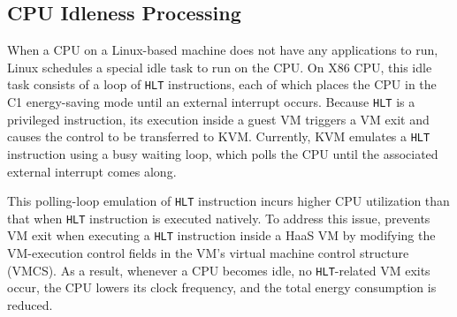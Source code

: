 {\subsection{CPU Idleness Processing}

When a CPU on a Linux-based machine does not have any applications to run,
Linux schedules a special idle task to run on the CPU. On X86 CPU, this idle task consists of a loop of {\tt HLT} instructions, 
each of which places the CPU in the C1 energy-saving mode until an external interrupt occurs.
Because {\tt HLT} is a privileged instruction, its execution inside a guest VM triggers a VM exit and causes the control to be transferred to KVM. 
Currently, KVM emulates a {\tt HLT} instruction using a busy waiting loop, which polls the CPU until the associated external interrupt comes along. 

This polling-loop emulation of {\tt HLT} instruction incurs higher CPU utilization than that when {\tt HLT} instruction is executed natively. 
To address this issue, \na prevents VM exit when executing a {\tt HLT} instruction inside a HaaS VM by modifying the VM-execution control fields 
in the VM's virtual machine control structure (VMCS).
As a result, whenever a CPU becomes idle, no {\tt HLT}-related VM exits occur, the CPU lowers its clock frequency, and the total energy consumption is reduced. 

}

